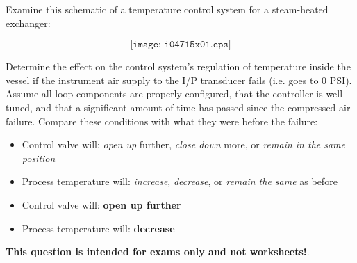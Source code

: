 

Examine this schematic of a temperature control system for a steam-heated exchanger:

$$\texttt{[image: i04715x01.eps]}$$

Determine the effect on the control system's regulation of temperature inside the vessel if the instrument air supply to the I/P transducer fails (i.e. goes to 0 PSI).  Assume all loop components are properly configured, that the controller is well-tuned, and that a significant amount of time has passed since the compressed air failure.  Compare these conditions with what they were before the failure:

\begin{itemize}
\item{} Control valve will: {\it open up} further, {\it close down} more, or {\it remain in the same position} 
\vskip 10pt
\item{} Process temperature will: {\it increase}, {\it decrease}, or {\it remain the same} as before
\end{itemize}







\begin{itemize}
\item{} Control valve will: {\bf open up further}
\vskip 10pt
\item{} Process temperature will: {\bf decrease}
\end{itemize}







{\bf This question is intended for exams only and not worksheets!}.


